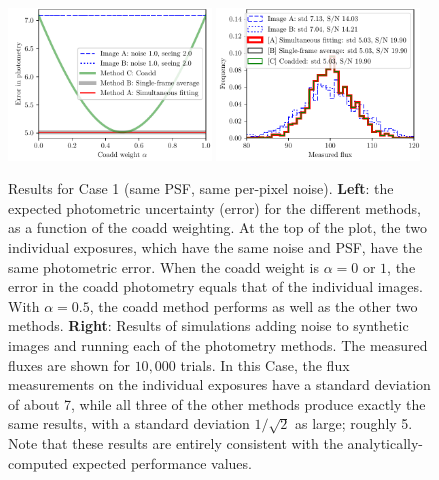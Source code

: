 \documentclass[letter,11pt]{article}
\begin{document}
\begin{figure}[h!]
  \begin{center}
    \includegraphics[width=0.48\textwidth]{coadd-00}
    \includegraphics[width=0.48\textwidth]{coadd-01}
  \end{center}
  \caption{Results for Case 1 (same PSF, same per-pixel noise).  \textbf{Left}: the expected photometric
    uncertainty (error) for the different methods, as a function of
    the coadd weighting.  At the top of the plot, the two individual
    exposures, which have the same noise and PSF, have the same
    photometric error.  When the coadd weight is $\alpha = 0$ or $1$,
    the error in the coadd photometry equals that of the individual
    images.  With $\alpha = 0.5$, the coadd method performs as well as
    the other two methods.
    \newline \textbf{Right}: Results of simulations
    adding noise to synthetic images and running each of the
    photometry methods.  The measured fluxes are shown for $10,000$
    trials.  In this Case, the flux measurements on the individual
    exposures have a standard deviation of about 7, while all three
    of the other methods produce exactly the same results, with a standard
    deviation $1/\sqrt{2}$ as large; roughly 5.  Note that these results are
    entirely consistent with the analytically-computed expected performance values.
    \label{fig:caseone}}
\end{figure}
\end{document}
